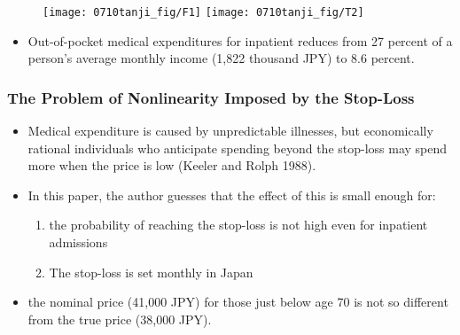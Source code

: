 \documentclass[dvipdfmx,11pt]{beamer}
\begin{document}
\begin{frame}\frametitle{}
  \begin{figure}[ht]
    \centering
    \texttt{[image: 0710tanji\_fig/F1]}
    \texttt{[image: 0710tanji\_fig/T2]}
  \end{figure}
  \begin{itemize}
    \item Out-of-pocket medical expenditures for inpatient reduces from 27 percent of a person’s average monthly income (1,822 thousand JPY) to 8.6 percent.
  \end{itemize}
\end{frame}

\begin{frame}\frametitle{The Problem of Nonlinearity Imposed by the Stop-Loss}
  \begin{itemize}
    \item Medical expenditure is caused by unpredictable illnesses, but  economically rational individuals who anticipate spending beyond the stop-loss may spend more when the price is low (Keeler and Rolph 1988).
    \item In this paper, the author guesses that the effect of this is small enough for:
    \begin{enumerate}
      \item the probability of reaching the stop-loss is not high even for inpatient admissions
      \item The stop-loss is set monthly in Japan
    \end{enumerate}
    \item the nominal price (41,000 JPY) for those just below age 70 is not so different from the true price (38,000 JPY).
  \end{itemize}
\end{frame}
\end{document}
